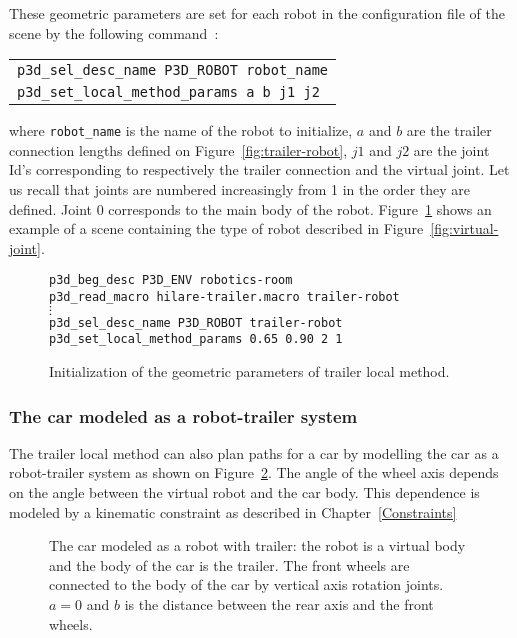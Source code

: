 These geometric parameters are set for each robot in the configuration
file of the scene by the following command~:

\begin{tabular}{l}
{\tt p3d\_sel\_desc\_name P3D\_ROBOT robot\_name} \\
{\tt p3d\_set\_local\_method\_params a b j1 j2}\index{p3d\_set\_local\_method\_params}
 \\
\end{tabular}

where {\tt robot\_name} is the name of the robot to initialize, $a$
and $b$ are the trailer connection lengths defined on
Figure~\ref{fig:trailer-robot}, $j1$ and $j2$ are the joint Id's
corresponding to respectively the trailer connection and the virtual
joint. Let us recall that joints are numbered increasingly from 1 in
the order they are defined. Joint 0 corresponds to the main body of
the robot. Figure~\ref{fig:local-method-params} shows an example of a
scene containing the type of robot described in
Figure~\ref{fig:virtual-joint}. 

\begin{figure}[ht]
{\tt p3d\_beg\_desc P3D\_ENV robotics-room} \\
{\tt p3d\_read\_macro hilare-trailer.macro trailer-robot} \\
\hsp\hsp\hsp $\vdots$ \\
{\tt p3d\_sel\_desc\_name P3D\_ROBOT trailer-robot} \\
{\tt p3d\_set\_local\_method\_params 0.65 0.90 2 1} \\

\caption{Initialization of the geometric parameters of trailer local
  method.}
\label{fig:local-method-params}
\end{figure}

\subsubsection*{The car modeled as a robot-trailer system}

The trailer local method can also plan paths for a car by modelling
the car as a robot-trailer system as shown on
Figure~\ref{fig:car-model}. The angle of the wheel axis depends on the
angle between the virtual robot and the car body. This dependence is
modeled by a kinematic constraint as described in Chapter~\ref{Constraints}
\begin{figure}[ht]
\centerline{}
\caption{The car modeled as a robot with trailer: the robot is a virtual
  body and the body of the car is the trailer. The front wheels are
  connected to the body of the car by vertical axis rotation
  joints. $a=0$ and $b$ is the distance between the rear axis and the
  front wheels.}
\label{fig:car-model}
\end{figure}

